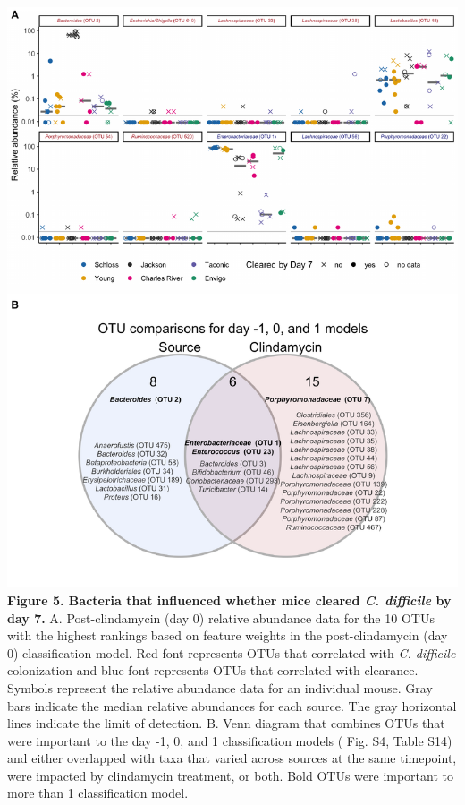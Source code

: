 \documentclass[
  11pt,
]{article}
\begin{document}
\newpage

\includegraphics{figure_5.pdf} \textbf{Figure 5. Bacteria that
influenced whether mice cleared \emph{C. difficile} by day 7.} A.
Post-clindamycin (day 0) relative abundance data for the 10 OTUs with
the highest rankings based on feature weights in the post-clindamycin
(day 0) classification model. Red font represents OTUs that correlated
with \emph{C. difficile} colonization and blue font represents OTUs that
correlated with clearance. Symbols represent the relative abundance data
for an individual mouse. Gray bars indicate the median relative
abundances for each source. The gray horizontal lines indicate the limit
of detection. B. Venn diagram that combines OTUs that were important to
the day -1, 0, and 1 classification models ( Fig. S4, Table S14) and
either overlapped with taxa that varied across sources at the same
timepoint, were impacted by clindamycin treatment, or both. Bold OTUs
were important to more than 1 classification model.

\newpage
\end{document}
